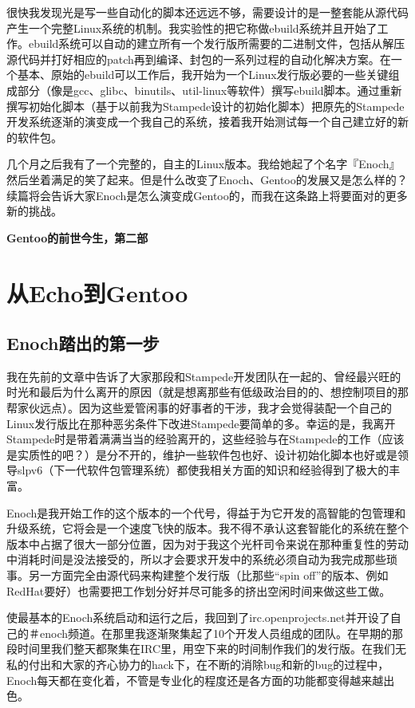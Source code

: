 很快我发现光是写一些自动化的脚本还远远不够，需要设计的是一整套能从源代码产生一个完整Linux系统的机制。我实验性的把它称做ebuild系统并且开始了工作。ebuild系统可以自动的建立所有一个发行版所需要的二进制文件，包括从解压源代码并打好相应的patch再到编译、封包的一系列过程的自动化解决方案。在一个基本、原始的ebuild可以工作后，我开始为一个Linux发行版必要的一些关键组成部分（像是gcc、glibc、binutils、util-linux等软件）撰写ebuild脚本。通过重新撰写初始化脚本（基于以前我为Stampede设计的初始化脚本）把原先的Stampede开发系统逐渐的演变成一个我自己的系统，接着我开始测试每一个自己建立好的新的软件包。

几个月之后我有了一个完整的，自主的Linux版本。我给她起了个名字『Enoch』然后坐着满足的笑了起来。但是什么改变了Enoch、Gentoo的发展又是怎么样的？续篇将会告诉大家Enoch是怎么演变成Gentoo的，而我在这条路上将要面对的更多新的挑战。

{\huge\bf Gentoo的前世今生，第二部 }


\section{从Echo到Gentoo}

\subsection{Enoch踏出的第一步}

我在先前的文章中告诉了大家那段和Stampede开发团队在一起的、曾经最兴旺的时光和最后为什么离开的原因（就是想离那些有低级政治目的的、想控制项目的那帮家伙远点）。因为这些爱管闲事的好事者的干涉，我才会觉得装配一个自己的Linux发行版比在那种恶劣条件下改进Stampede要简单的多。幸运的是，我离开Stampede时是带着满满当当的经验离开的，这些经验与在Stampede的工作（应该是实质性的吧？）是分不开的，维护一些软件包也好、设计初始化脚本也好或是领导slpv6（下一代软件包管理系统）都使我相关方面的知识和经验得到了极大的丰富。

Enoch是我开始工作的这个版本的一个代号，得益于为它开发的高智能的包管理和升级系统，它将会是一个速度飞快的版本。我不得不承认这套智能化的系统在整个版本中占据了很大一部分位置，因为对于我这个光杆司令来说在那种重复性的劳动中消耗时间是没法接受的，所以才会要求开发中的系统必须自动为我完成那些琐事。另一方面完全由源代码来构建整个发行版（比那些“spin off”的版本、例如RedHat要好）也需要把工作划分好并尽可能多的挤出空闲时间来做这些工做。

使最基本的Enoch系统启动和运行之后，我回到了irc.openprojects.net并开设了自己的＃enoch频道。在那里我逐渐聚集起了10个开发人员组成的团队。在早期的那段时间里我们整天都聚集在IRC里，用空下来的时间制作我们的发行版。在我们无私的付出和大家的齐心协力的hack下，在不断的消除bug和新的bug的过程中，Enoch每天都在变化着，不管是专业化的程度还是各方面的功能都变得越来越出色。

